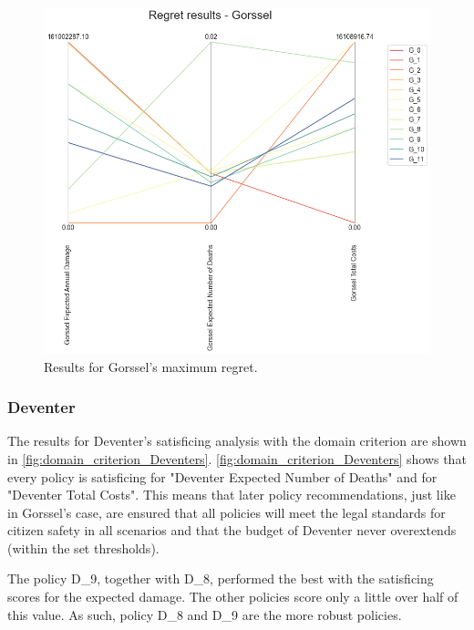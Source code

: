 \begin{figure}[H]
\begin{minipage}[b]{0.4\textwidth}
    \includegraphics[width=1.15\textwidth]{report/figures/results/regret_figure_Gorssel.png}
    \caption{Results for Gorssel's maximum regret.}
    \label{fig:regret_gorssel}
  \end{minipage}
\end{figure}




\subsubsection{Deventer}
The results for Deventer's satisficing analysis with the domain criterion are shown in  \autoref{fig:domain_criterion_Deventers}. 
\autoref{fig:domain_criterion_Deventers} shows that every policy is satisficing for "Deventer Expected Number of Deaths" and for "Deventer Total Costs". This means that later policy recommendations, just like in Gorssel's case, are ensured that all policies will meet the legal standards for citizen safety in all scenarios and that the budget of Deventer never overextends (within the set thresholds). 

The policy D\_9, together with D\_8, performed the best with the satisficing scores for the expected damage. The other policies score only a little over half of this value. As such, policy D\_8 and D\_9 are the more robust policies. \newline 

